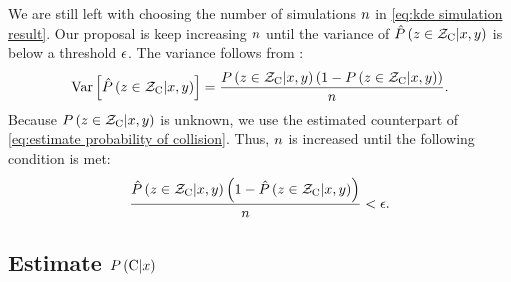 We are still left with choosing the number of simulations $n$ in \cref{eq:kde simulation result}.
Our proposal is keep increasing $n$ until the variance of $\hat{P}\left(  z \in \mathcal{Z}_{\mathrm{C}} | x, y  \right)$ is below a threshold $\epsilon$.
The variance follows from \textcite{nadaraya1964some}:
\begin{equation}
	\mathrm{Var}\left[\hat{P}\left(  z \in \mathcal{Z}_{\mathrm{C}} | x, y  \right)\right]
	= \frac{P\left(  z \in \mathcal{Z}_{\mathrm{C}} | x, y  \right)
		\left( 1-P\left(  z \in \mathcal{Z}_{\mathrm{C}} | x, y  \right) \right)}{n}.
\end{equation}
Because $P\left(  z \in \mathcal{Z}_{\mathrm{C}} | x, y  \right)$ is unknown, we use the estimated counterpart of \cref{eq:estimate probability of collision}.
Thus, $n$ is increased until the following condition is met:
\begin{equation}
	\label{eq:condition stop simulations}
	\frac{\hat{P}\left(  z \in \mathcal{Z}_{\mathrm{C}} | x, y  \right)
		\left( 1-\hat{P}\left(  z \in \mathcal{Z}_{\mathrm{C}} | x, y  \right) \right)}{n}
	< \epsilon.
\end{equation}



\subsection{Estimate $P\left(  \mathrm{C} | x  \right)$}

